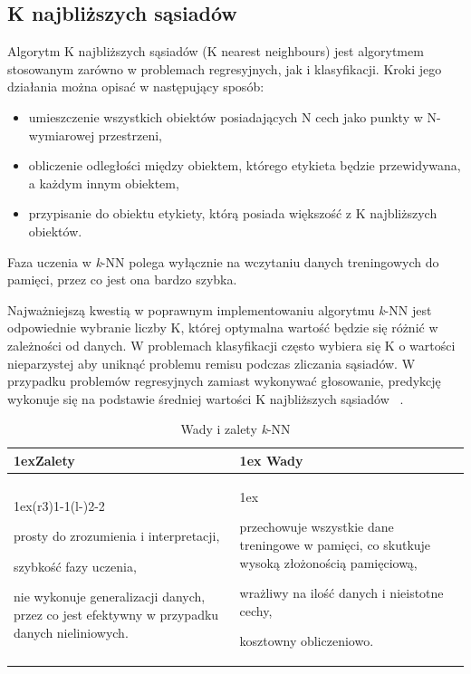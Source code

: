 \subsection{K najbliższych sąsiadów}

Algorytm K najbliższych sąsiadów (K nearest neighbours) jest algorytmem
stosowanym zarówno w problemach regresyjnych, jak i klasyfikacji. Kroki jego działania
można opisać w następujący sposób:
\begin{itemize}
    \item umieszczenie wszystkich obiektów posiadających N cech jako punkty w N-wymiarowej przestrzeni,
    \item obliczenie odległości między obiektem, którego etykieta będzie przewidywana, a każdym innym
    obiektem,
    \item przypisanie do obiektu etykiety, którą posiada większość z K najbliższych obiektów. 
\end{itemize}
Faza uczenia w \textit{k}-NN polega wyłącznie na wczytaniu danych treningowych do pamięci, przez co jest 
ona bardzo szybka.

Najważniejszą kwestią w poprawnym implementowaniu algorytmu \textit{k}-NN jest odpowiednie wybranie liczby
K, której optymalna wartość będzie się różnić w zależności od danych. W problemach 
klasyfikacji często wybiera się K o wartości nieparzystej aby uniknąć problemu remisu
podczas zliczania sąsiadów. W przypadku problemów regresyjnych zamiast wykonywać głosowanie,
predykcję wykonuje się na podstawie średniej wartości K najbliższych sąsiadów ~\cite{MLAlgorithms}.

\begin{table}[h]
    \begin{tabularx}{\linewidth}{>{\parskip1ex}X@{\kern4\tabcolsep}>{\parskip1ex}X}
    \toprule
    \hfil\bfseries Zalety
    &
    \hfil\bfseries Wady
    \\\cmidrule(r{3\tabcolsep}){1-1}\cmidrule(l{-\tabcolsep}){2-2}
    
    prosty do zrozumienia i interpretacji,\par
    szybkość fazy uczenia,\par
    nie wykonuje generalizacji danych, przez co jest efektywny w przypadku danych nieliniowych.\par
    &
    
    przechowuje wszystkie dane treningowe w pamięci, co skutkuje wysoką złożonością pamięciową,\par
    wrażliwy na ilość danych i nieistotne cechy,\par
    kosztowny obliczeniowo.\par
    \\\bottomrule
    \end{tabularx}
    \caption{Wady i zalety \textit{k}-NN}
\end{table}
    

